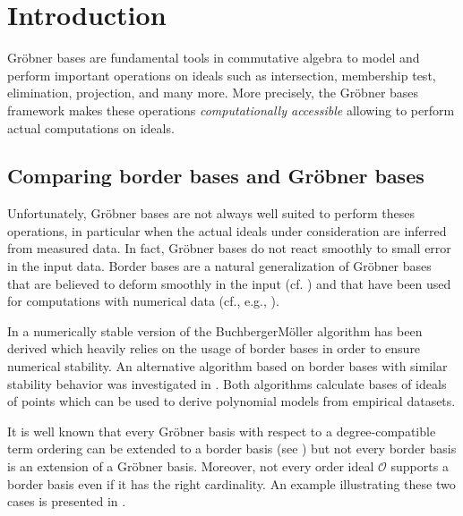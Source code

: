 \documentclass[11pt,oneside,english]{amsart}
\makeatletter
\numberwithin{equation}{section}
\numberwithin{figure}{section}
\theoremstyle{plain}
\theoremstyle{definition}
\theoremstyle{definition}
\theoremstyle{remark}
\theoremstyle{plain}
\theoremstyle{plain}
\theoremstyle{plain}
\theoremstyle{problem@}
\makeatother
\begin{document}
\section{Introduction}

Gröbner bases are fundamental tools in commutative algebra to model
and perform important operations on ideals such as intersection, membership
test, elimination, projection, and many more. More precisely, the
Gröbner bases framework makes these operations \emph{computationally
accessible} allowing to perform actual computations on ideals.

\subsection{Comparing border bases and Gröbner bases}
\label{sec:comp-bord-bases}

Unfortunately,
Gröbner bases are not always well suited to perform theses operations,
in particular when the actual ideals under consideration are inferred
from measured data. In fact, Gröbner bases do not react smoothly to
small error in the input data.
Border bases are a natural
generalization of Gröbner bases that are believed to 
 deform smoothly in the input (cf. \cite{kreuzer2008dbb}) and that have been used for computations with numerical data (cf., e.g., \cite{HKPP2009, abbott2008sbb}). 

In \cite{HKPP2009} a numerically stable version of the Buchberger\textendash Möller
algorithm has been derived which heavily relies on the usage of border
bases in order to ensure numerical stability. An alternative algorithm
based on border bases with similar stability behavior was investigated
in \cite{abbott2008sbb}. Both algorithms calculate bases of ideals
of points which can be used to derive polynomial models from empirical
datasets. 

It is well known that every Gröbner basis with respect to a degree-compatible
term ordering can be extended to a border basis (see \cite[p.\ 281ff]{kehrein2006cbb})
but not every border basis is an extension of a Gröbner
basis. Moreover, not every order ideal ${\mathcal{O}}$ supports a border basis
even if it has the right
cardinality. An example illustrating these
two cases is presented in \cite[Example 6]{kehrein2006cbb}. 
\end{document}
